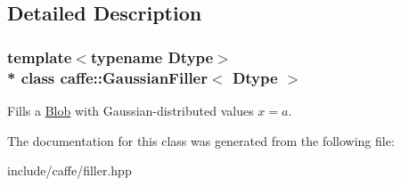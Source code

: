 \subsection{Detailed Description}
\subsubsection*{template$<$typename Dtype$>$\\*
class caffe\+::\+Gaussian\+Filler$<$ Dtype $>$}

Fills a \hyperlink{classcaffe_1_1Blob}{Blob} with Gaussian-\/distributed values $ x = a $. 

The documentation for this class was generated from the following file\+:\begin{DoxyCompactItemize}
\item 
include/caffe/filler.\+hpp\end{DoxyCompactItemize}
